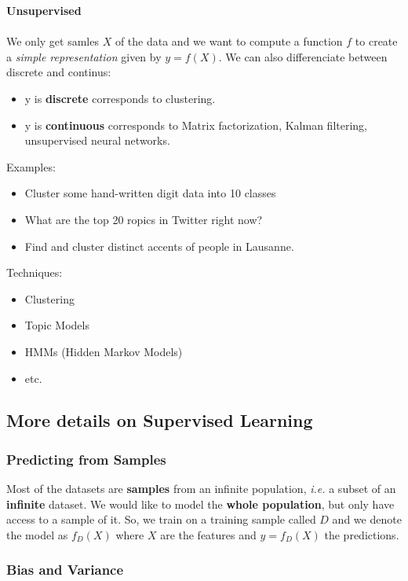 \textbf{Unsupervised}
\\\\
We only get samles $X$ of the data and we want to compute a function $f$ to create a \emph{simple representation} given by $y = f(X)$. We can also differenciate between discrete and continus:
\begin{itemize}
 \item y is \textbf{discrete} corresponds to clustering.
 \item y is \textbf{continuous} corresponds to Matrix factorization, Kalman filtering, unsupervised neural networks. 
\end{itemize}
Examples:
\begin{itemize}
 \item Cluster some hand-written digit data into 10 classes
 \item What are the top 20 ropics in Twitter right now?
 \item Find and cluster distinct accents of people in Lausanne. 
\end{itemize}
Techniques:
\begin{itemize}
 \item Clustering
 \item Topic Models
 \item HMMs (Hidden Markov Models)
 \item etc.
\end{itemize}

\subsection{More details on Supervised Learning}

\subsubsection{Predicting from Samples}

Most of the datasets are \textbf{samples} from an infinite population, \emph{i.e.} a subset of an \textbf{infinite} dataset. We would like to model the \textbf{whole population}, but only have access to a sample of it. So, we train on a training sample called $D$ and we denote the model as $f_D(X)$ where $X$ are the features and $y=f_D(X)$ the predictions.

\subsubsection{Bias and Variance}

